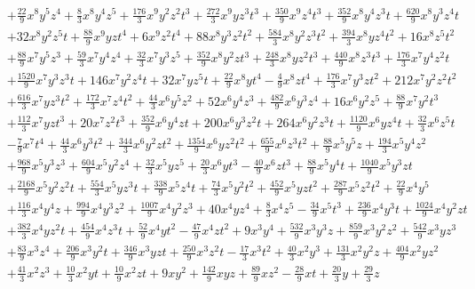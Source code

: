 \documentclass[11pt]{article}
\theoremstyle{plain}
\theoremstyle{definition}
\theoremstyle{remark}
\begin{document}
{\begin{align*}
&+\tfrac{22}{9}x^8y^5z^4+\tfrac{8}{3}x^8y^4z^5+\tfrac{176}{3}x^9y^2z^2t^3+\tfrac{272}{3}x^9yz^3t^3+\tfrac{350}{9}x^9z^4t^3+\tfrac{352}{9}x^8y^4z^3t+\tfrac{620}{9}x^8y^3z^4t\\
&+32x^8y^2z^5t+\tfrac{88}{9}x^9yzt^4+6x^9z^2t^4+88x^8y^3z^2t^2+\tfrac{584}{3}x^8y^2z^3t^2+\tfrac{394}{3}x^8yz^4t^2+16x^8z^5t^2\\
&+\tfrac{88}{9}x^7y^5z^3+\tfrac{59}{3}x^7y^4z^4+\tfrac{32}{3}x^7y^3z^5+\tfrac{352}{9}x^8y^2zt^3+\tfrac{248}{3}x^8yz^2t^3+\tfrac{440}{9}x^8z^3t^3+\tfrac{176}{3}x^7y^4z^2t\\
&+\tfrac{1520}{9}x^7y^3z^3t+146x^7y^2z^4t+32x^7yz^5t+\tfrac{22}{9}x^8yt^4-\tfrac{4}{9}x^8zt^4+\tfrac{176}{3}x^7y^3zt^2+212x^7y^2z^2t^2\\
&+\tfrac{616}{3}x^7yz^3t^2+\tfrac{172}{3}x^7z^4t^2+\tfrac{44}{3}x^6y^5z^2+52x^6y^4z^3+\tfrac{482}{9}x^6y^3z^4+16x^6y^2z^5+\tfrac{88}{9}x^7y^2t^3\\
&+\tfrac{112}{3}x^7yzt^3+20x^7z^2t^3+\tfrac{352}{9}x^6y^4zt+200x^6y^3z^2t+264x^6y^2z^3t+\tfrac{1120}{9}x^6yz^4t+\tfrac{32}{3}x^6z^5t\\
&-\tfrac{7}{9}x^7t^4+\tfrac{44}{3}x^6y^3t^2+\tfrac{344}{3}x^6y^2zt^2+\tfrac{1354}{9}x^6yz^2t^2+\tfrac{655}{9}x^6z^3t^2+\tfrac{88}{9}x^5y^5z+\tfrac{194}{3}x^5y^4z^2\\
&+\tfrac{968}{9}x^5y^3z^3+\tfrac{604}{9}x^5y^2z^4+\tfrac{32}{3}x^5yz^5+\tfrac{20}{3}x^6yt^3-\tfrac{40}{9}x^6zt^3+\tfrac{88}{9}x^5y^4t+\tfrac{1040}{9}x^5y^3zt\\
&+\tfrac{2168}{9}x^5y^2z^2t+\tfrac{554}{3}x^5yz^3t+\tfrac{338}{9}x^5z^4t+\tfrac{74}{3}x^5y^2t^2+\tfrac{452}{9}x^5yzt^2+\tfrac{287}{9}x^5z^2t^2+\tfrac{22}{9}x^4y^5\\
&+\tfrac{116}{3}x^4y^4z+\tfrac{994}{9}x^4y^3z^2+\tfrac{1007}{9}x^4y^2z^3+40x^4yz^4+\tfrac{8}{3}x^4z^5-\tfrac{34}{9}x^5t^3+\tfrac{236}{9}x^4y^3t+\tfrac{1024}{9}x^4y^2zt\\
&+\tfrac{382}{3}x^4yz^2t+\tfrac{454}{9}x^4z^3t+\tfrac{52}{9}x^4yt^2-\tfrac{47}{9}x^4zt^2+9x^3y^4+\tfrac{532}{9}x^3y^3z+\tfrac{859}{9}x^3y^2z^2+\tfrac{542}{9}x^3yz^3\\
&+\tfrac{83}{9}x^3z^4+\tfrac{206}{9}x^3y^2t+\tfrac{346}{9}x^3yzt+\tfrac{250}{9}x^3z^2t-\tfrac{17}{3}x^3t^2+\tfrac{40}{3}x^2y^3+\tfrac{131}{3}x^2y^2z+\tfrac{404}{9}x^2yz^2\\
&+\tfrac{41}{3}x^2z^3+\tfrac{10}{3}x^2yt+\tfrac{10}{9}x^2zt+9xy^2+\tfrac{142}{9}xyz+\tfrac{89}{9}xz^2-\tfrac{28}{9}xt+\tfrac{20}{3}y+\tfrac{29}{3}z
\end{align*}
}
\end{document}
